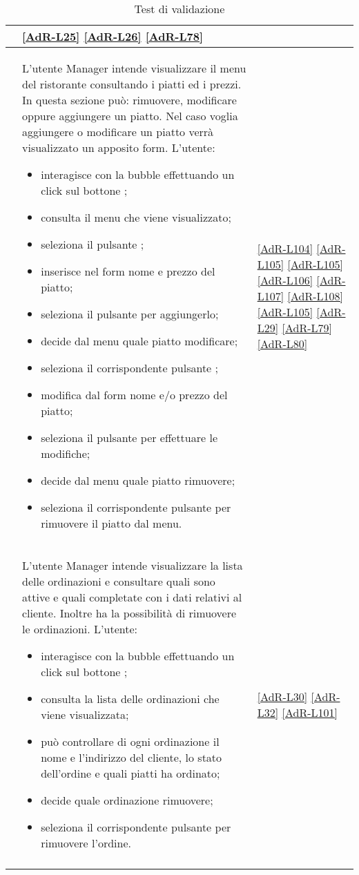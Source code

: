 \begin{longtable}{|c|P{9cm}|P{2.5cm}|}
\begin{itemize}
	\end{itemize}
	&\ref{AdR-L25} \ref{AdR-L26} \ref{AdR-L78}\\
	\hline {} & L'utente Manager intende visualizzare il menu del ristorante consultando i piatti ed i prezzi. In questa sezione può: rimuovere, modificare oppure aggiungere un piatto.
	Nel caso voglia aggiungere o modificare un piatto verrà visualizzato un apposito form. L'utente:
	\begin{itemize}
		\item interagisce con la bubble effettuando un click sul bottone ;
		\item consulta il menu che viene visualizzato; 
		\item seleziona il pulsante ;
		\item inserisce nel form nome e prezzo del piatto;
		\item seleziona il pulsante  per aggiungerlo;
		\item decide dal menu quale piatto modificare;
		\item seleziona il corrispondente pulsante ;
		\item modifica dal form nome e/o prezzo del piatto;
		\item seleziona il pulsante  per effettuare le modifiche;
		\item decide dal menu quale piatto rimuovere;
		\item seleziona il corrispondente pulsante  per rimuovere il piatto dal menu.
	\end{itemize}
	& \ref{AdR-L104} \ref{AdR-L105} \ref{AdR-L105} \ref{AdR-L106} \ref{AdR-L107} \ref{AdR-L108} \ref{AdR-L105} \ref{AdR-L29} \ref{AdR-L79} \ref{AdR-L80} \\
	\hline {} & L'utente Manager intende visualizzare la lista delle ordinazioni e consultare quali sono attive e quali completate con i dati relativi al cliente. Inoltre ha la possibilità di rimuovere le ordinazioni. L'utente:
	\begin{itemize}
		\item interagisce con la bubble effettuando un click sul bottone ;
		\item consulta la lista delle ordinazioni che viene visualizzata; 
		\item può controllare di ogni ordinazione il nome e l'indirizzo del cliente, lo stato dell'ordine e quali piatti ha ordinato;
		\item decide quale ordinazione rimuovere;
		\item seleziona il corrispondente pulsante  per rimuovere l'ordine.
	\end{itemize}
	& \ref{AdR-L30} \ref{AdR-L32} \ref{AdR-L101} \\
	\hline
	\caption{Test di validazione \DemoName{}}
\end{longtable}

